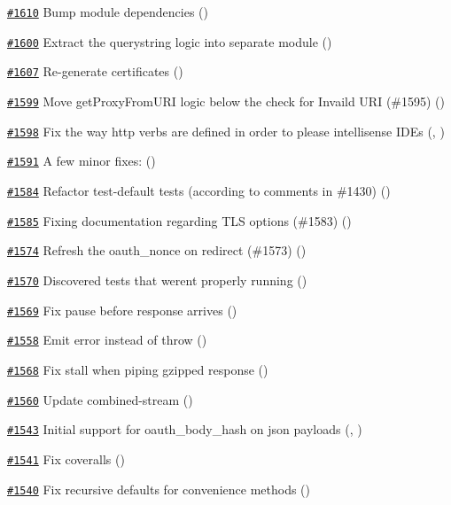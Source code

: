 \begin{DoxyItemize}
\item \href{https://github.com/request/request/pull/1610}{\tt \#1610} Bump module dependencies ()
\item \href{https://github.com/request/request/pull/1600}{\tt \#1600} Extract the querystring logic into separate module ()
\item \href{https://github.com/request/request/pull/1607}{\tt \#1607} Re-\/generate certificates ()
\item \href{https://github.com/request/request/pull/1599}{\tt \#1599} Move get\+Proxy\+From\+U\+RI logic below the check for Invaild U\+RI (\#1595) ()
\item \href{https://github.com/request/request/pull/1598}{\tt \#1598} Fix the way http verbs are defined in order to please intellisense I\+D\+Es (, )
\item \href{https://github.com/request/request/pull/1591}{\tt \#1591} A few minor fixes\+: ()
\item \href{https://github.com/request/request/pull/1584}{\tt \#1584} Refactor test-\/default tests (according to comments in \#1430) ()
\item \href{https://github.com/request/request/pull/1585}{\tt \#1585} Fixing documentation regarding T\+LS options (\#1583) ()
\item \href{https://github.com/request/request/pull/1574}{\tt \#1574} Refresh the oauth\+\_\+nonce on redirect (\#1573) ()
\item \href{https://github.com/request/request/pull/1570}{\tt \#1570} Discovered tests that weren\textquotesingle{}t properly running ()
\item \href{https://github.com/request/request/pull/1569}{\tt \#1569} Fix pause before response arrives ()
\item \href{https://github.com/request/request/pull/1558}{\tt \#1558} Emit error instead of throw ()
\item \href{https://github.com/request/request/pull/1568}{\tt \#1568} Fix stall when piping gzipped response ()
\item \href{https://github.com/request/request/pull/1560}{\tt \#1560} Update combined-\/stream ()
\item \href{https://github.com/request/request/pull/1543}{\tt \#1543} Initial support for oauth\+\_\+body\+\_\+hash on json payloads (, )
\item \href{https://github.com/request/request/pull/1541}{\tt \#1541} Fix coveralls ()
\item \href{https://github.com/request/request/pull/1540}{\tt \#1540} Fix recursive defaults for convenience methods ()

\end{DoxyItemize}
